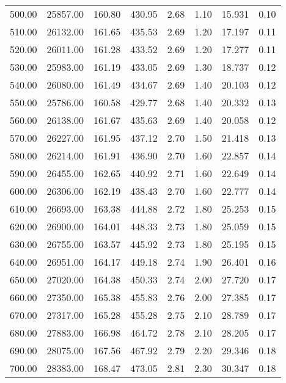 \begin{table}
\begin{tabular}{S S S S S S S S }
500.00  & 25857.00  & 160.80  & 430.95  & 2.68  & 1.10  & 15.931  & 0.10\\ 
510.00  & 26132.00  & 161.65  & 435.53  & 2.69  & 1.20  & 17.197  & 0.11\\ 
520.00  & 26011.00  & 161.28  & 433.52  & 2.69  & 1.20  & 17.277  & 0.11\\ 
530.00  & 25983.00  & 161.19  & 433.05  & 2.69  & 1.30  & 18.737  & 0.12\\ 
540.00  & 26080.00  & 161.49  & 434.67  & 2.69  & 1.40  & 20.103  & 0.12\\ 
550.00  & 25786.00  & 160.58  & 429.77  & 2.68  & 1.40  & 20.332  & 0.13\\ 
560.00  & 26138.00  & 161.67  & 435.63  & 2.69  & 1.40  & 20.058  & 0.12\\ 
570.00  & 26227.00  & 161.95  & 437.12  & 2.70  & 1.50  & 21.418  & 0.13\\ 
580.00  & 26214.00  & 161.91  & 436.90  & 2.70  & 1.60  & 22.857  & 0.14\\ 
590.00  & 26455.00  & 162.65  & 440.92  & 2.71  & 1.60  & 22.649  & 0.14\\ 
600.00  & 26306.00  & 162.19  & 438.43  & 2.70  & 1.60  & 22.777  & 0.14\\ 
610.00  & 26693.00  & 163.38  & 444.88  & 2.72  & 1.80  & 25.253  & 0.15\\ 
620.00  & 26900.00  & 164.01  & 448.33  & 2.73  & 1.80  & 25.059  & 0.15\\ 
630.00  & 26755.00  & 163.57  & 445.92  & 2.73  & 1.80  & 25.195  & 0.15\\ 
640.00  & 26951.00  & 164.17  & 449.18  & 2.74  & 1.90  & 26.401  & 0.16\\ 
650.00  & 27020.00  & 164.38  & 450.33  & 2.74  & 2.00  & 27.720  & 0.17\\ 
660.00  & 27350.00  & 165.38  & 455.83  & 2.76  & 2.00  & 27.385  & 0.17\\ 
670.00  & 27317.00  & 165.28  & 455.28  & 2.75  & 2.10  & 28.789  & 0.17\\ 
680.00  & 27883.00  & 166.98  & 464.72  & 2.78  & 2.10  & 28.205  & 0.17\\ 
690.00  & 28075.00  & 167.56  & 467.92  & 2.79  & 2.20  & 29.346  & 0.18\\ 
700.00  & 28383.00  & 168.47  & 473.05  & 2.81  & 2.30  & 30.347  & 0.18\\ 
\bottomrule 
\end{tabular} 
\end{table}